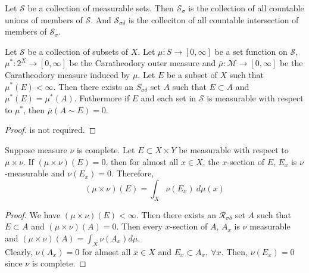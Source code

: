 \begin{definition}
	Let $\mathcal{S}$ be a collection of measurable sets.
	Then $\mathcal{S}_\sigma$ is the collection of all countable unions of members of $\mathcal{S}$.
	And $\mathcal{S}_{\sigma\delta}$ is the colleciton of all countable intersection of members of $\mathcal{S}_\sigma$.
\end{definition}

\begin{proposition}[\S10.17 pp. 362]
	Let $\mathcal{S}$ be a collection of subsets of $X$.
	Let $\mu : S \to [0,\infty]$ be a set function on $\mathcal{S}$, $\mu^\ast : 2^X \to [0,\infty]$ be the Caratheodory outer measure and $\bar{\mu} : \mathcal{M} \to [0,\infty]$ be the Caratheodory measure induced by $\mu$.
	Let $E$ be a subset of $X$ such that $\mu^\ast(E) < \infty$.
	Then there exists an $S_{\sigma\delta}$ set $A$ such that $E \subset A$ and $\mu^\ast(E) = \mu^\ast(A)$.
	Futhermore if $E$ and each set in $\mathcal{S}$ is measurable with respect to $\mu^\ast$, then $\bar{\mu}(A \sim E) = 0$.
\end{proposition}
\begin{proof}
	is not required.
\end{proof}

\begin{lemma}
	Suppose measure $\nu$ is complete.
	Let $E \subset X \times Y$ be measurable with respect to $\mu \times \nu$.
	If $(\mu \times \nu)(E) = 0$, then for almost all $x \in X$, the $x$-section of $E$, $E_x$ is $\nu$-measurable and $\nu(E_x) = 0$.
	Therefore,
	\begin{equation}
		(\mu \times \nu)(E) = \int_X \nu(E_x) \ d\mu(x)
	\end{equation}
\end{lemma}
\begin{proof}
	We have $(\mu \times \nu)(E) < \infty$.
	Then there exists an $\mathcal{R}_{\sigma\delta}$ set $A$ such that $E \subset A$ and $(\mu \times \nu)(A) = 0$.
	Then every $x$-section of $A$, $A_x$ is $\nu$ measurable and $(\mu \times \nu)(A) = \int_X \nu(A_x) d\mu$.\\

	Clearly, $\nu(A_x) = 0$ for almost all $x \in X$ and $E_x \subset A_x,\ \forall x$.
	Then, $\nu(E_x) = 0$ since $\nu$ is complete.
\end{proof}

